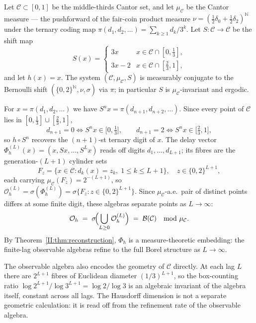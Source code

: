 \begin{example}
\label{II:ex:cantor}
Let $\mathcal{C} \subset [0,1]$ be the middle-thirds Cantor set, and let
$\mu_\mathcal{C}$ be the Cantor measure --- the pushforward of the fair-coin
product measure $\nu = (\tfrac{1}{2}\delta_0 + \tfrac{1}{2}\delta_2)^{\mathbb{N}}$
under the ternary coding map $\pi(d_1,d_2,\ldots) = \sum_{k \geq 1} d_k/3^k$.
Let $S : \mathcal{C} \to \mathcal{C}$ be the shift map
\[
  S(x) = \begin{cases} 3x & x \in \mathcal{C} \cap [0,\tfrac{1}{3}], \\
                        3x - 2 & x \in \mathcal{C} \cap [\tfrac{2}{3},1],
          \end{cases}
\]
and let $h(x) = x$.  The system $(\mathcal{C},\mu_\mathcal{C},S)$ is
measurably conjugate to the Bernoulli shift $(\{0,2\}^{\mathbb{N}},\nu,\sigma)$
via $\pi$; in particular $S$ is $\mu_\mathcal{C}$-invariant and ergodic.

For $x = \pi(d_1,d_2,\ldots)$ we have $S^n x = \pi(d_{n+1},d_{n+2},\ldots)$.
Since every point of $\mathcal{C}$ lies in $[0,\tfrac{1}{3}] \cup [\tfrac{2}{3},1]$,
\[
  d_{n+1} = 0 \iff S^n x \in \bigl[0,\tfrac{1}{3}\bigr], \qquad
  d_{n+1} = 2 \iff S^n x \in \bigl[\tfrac{2}{3},1\bigr],
\]
so $h \circ S^n$ recovers the $(n+1)$-st ternary digit of $x$.  The delay
vector $\Phi_h^{(L)}(x) = (x, Sx, \ldots, S^L x)$ reads off digits
$d_1,\ldots,d_{L+1}$; its fibres are the generation-$(L+1)$ cylinder sets
\[
  F_z = \{x \in \mathcal{C} : d_k(x) = z_k,\; 1 \leq k \leq L+1\},
  \quad z \in \{0,2\}^{L+1},
\]
each carrying $\mu_\mathcal{C}(F_z) = 2^{-(L+1)}$, so
$\mathcal{O}_h^{(L)} = \sigma(\Phi_h^{(L)}) = \sigma\{F_z : z \in \{0,2\}^{L+1}\}$.
Since $\mu_\mathcal{C}$-a.e.\ pair of distinct points differs at some finite
digit, these algebras separate points as $L \to \infty$:
\[
  \mathcal{O}_h \;=\; \sigma\!\Bigl(\bigcup_{L \geq 0} \mathcal{O}_h^{(L)}\Bigr)
  \;=\; \mathcal{B}(\mathcal{C}) \quad \text{mod } \mu_\mathcal{C}.
\]
By Theorem~\ref{II:thm:reconstruction}, $\Phi_h$ is a measure-theoretic embedding:
the finite-lag observable algebras refine to the full Borel structure as $L \to \infty$.

The observable algebra also encodes the geometry of $\mathcal{C}$ directly.
At each lag $L$ there are $2^{L+1}$ fibres of Euclidean diameter $(1/3)^{L+1}$,
so the box-counting ratio $\log 2^{L+1}/\log 3^{L+1} = \log 2/\log 3$ is an
algebraic invariant of the algebra itself, constant across all lags.  The Hausdorff
dimension is not a separate geometric calculation: it is read off from the refinement
rate of the observable algebra.


\end{example}
